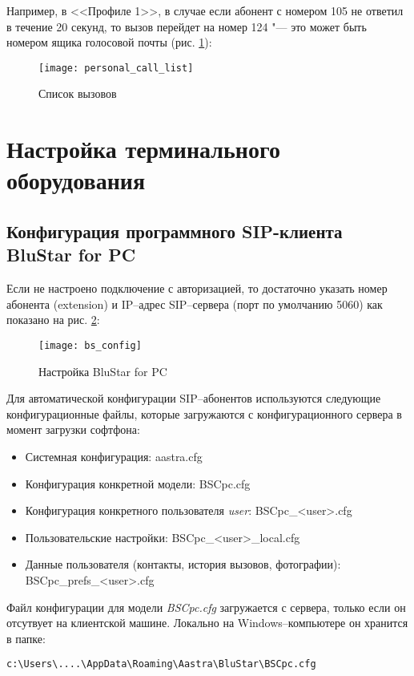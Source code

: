 Например, в <<Профиле 1>>, в случае если абонент с номером 105 не ответил в течение 20 секунд, то вызов перейдет на номер 124 "--- это может быть номером ящика голосовой почты (рис. \ref{img:personal_call_list}):

\begin{figure}[!ht]
  \center
  \texttt{[image: personal\_call\_list]}
  \caption{Список вызовов}
  \label{img:personal_call_list}
\end{figure}

\clearpage

\section{Настройка терминального оборудования}

\subsection{Конфигурация программного SIP-клиента BluStar for PC}

Если не настроено подключение с авторизацией, то достаточно указать номер абонента (extension) и IP--адрес SIP--сервера (порт по умолчанию 5060) как показано на рис. \ref{img:bs_config}:
\begin{figure}[!ht]
  \center
  \texttt{[image: bs\_config]}
  \caption{Настройка BluStar for PC}
  \label{img:bs_config}
\end{figure}

Для автоматической конфигурации SIP--абонентов используются следующие конфигурационные файлы, которые загружаются с конфигурационного сервера в момент загрузки софтфона:
\begin{itemize}
	\item Системная конфигурация:  aastra.cfg
	\item Конфигурация конкретной модели:  BSCpc.cfg
	\item Конфигурация конкретного пользователя {\em user}:  BSCpc\_<user>.cfg
        \item Пользовательские настройки: BSCpc\_<user>\_local.cfg
	\item Данные пользователя (контакты, история вызовов, фотографии): BSCpc\_prefs\_<user>.cfg
\end{itemize}

Файл конфигурации для модели {\em BSCpc.cfg} загружается с сервера, только если он отсутвует на клиентской машине. Локально на Windows--компьютере он хранится в папке:
\begin{lstlisting}
c:\Users\....\AppData\Roaming\Aastra\BluStar\BSCpc.cfg
\end{lstlisting}

